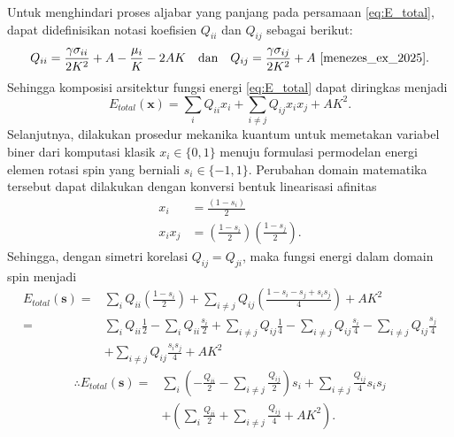 Untuk menghindari proses aljabar yang panjang pada persamaan \eqref{eq:E_total}, dapat didefinisikan notasi koefisien $Q_{ii}$ dan $Q_{ij}$ sebagai berikut:
\begin{equation*}
    Q_{ii} = \frac{\gamma \sigma_{ii}}{2K^2}+A-\frac{\mu_i}{K}-2AK \quad \text{dan} \quad Q_{ij} = \frac{\gamma \sigma_{ij}}{2K^2}+A~\cite{menezes_ex_2025}.
\end{equation*}
Sehingga komposisi arsitektur fungsi energi \eqref{eq:E_total} dapat diringkas menjadi
\begin{equation}
    E_{total}(\mathbf{x}) = \sum_i Q_{ii} x_i + \sum_{i\ne j} Q_{ij} x_ix_j + AK^2.
\end{equation}
Selanjutnya, dilakukan prosedur mekanika kuantum untuk memetakan variabel biner dari komputasi klasik $x_i \in \{0, 1\}$ menuju formulasi permodelan energi elemen rotasi spin yang berniali $s_i \in \{-1, 1\}$. Perubahan domain matematika tersebut dapat dilakukan dengan konversi bentuk linearisasi afinitas
\begin{equation}
    \begin{split}
    x_i &= \frac{(1 - s_i)}{2} \\
    x_ix_j &= \left(\frac{1-s_i}{2}\right)\left(\frac{1-s_j}{2}\right).
    \end{split}
    \label{eq:qubo_mapping}
\end{equation}
Sehingga, dengan simetri korelasi $Q_{ij} = Q_{ji}$, maka fungsi energi dalam domain spin menjadi
\begin{equation*}
\begin{split}
E_{total}(\mathbf{s}) =& \sum_i Q_{ii} \left(\frac{1 - s_i}{2}\right) + \sum_{i\ne j} Q_{ij} \left(\frac{1 - s_i - s_j + s_is_j}{4}\right) + AK^2 \\
=& \sum_i Q_{ii} \frac{1}{2} - \sum_i Q_{ii} \frac{s_i}{2} + \sum_{i\ne j} Q_{ij} \frac{1}{4} - \sum_{i\ne j} Q_{ij} \frac{s_i}{4} - \sum_{i\ne j} Q_{ij} \frac{s_j}{4} \\
&+ \sum_{i\ne j} Q_{ij} \frac{s_i s_j}{4} + AK^2
\end{split}
\end{equation*}
\begin{equation}
    \begin{split}
    \therefore E_{total}(\mathbf{s}) = &\sum_i \left(- \frac{Q_{ii}}{2} - \sum_{i\ne j} \frac{Q_{ij}}{2}\right) s_i + \sum_{i\ne j} \frac{Q_{ij}}{4} s_i s_j \\
    &+ \left(\sum_i \frac{Q_{ii}}{2} + \sum_{i\ne j} \frac{Q_{ij}}{4} + AK^2\right).
    \end{split}
\label{eq:qubo_domain_s}
\end{equation}

